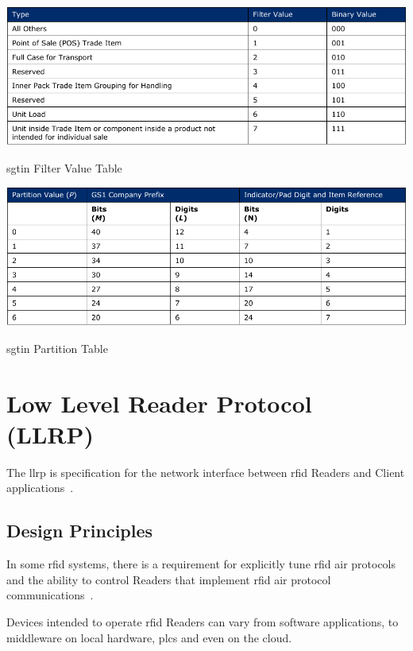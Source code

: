 \begin{table}[]
    \centering
    \includegraphics[width=\textwidth]{./figs/02-state-of-the-art/table_sgtin_filtervalues.pdf}
    \caption{\ac{sgtin} Filter Value Table~\cite{EPCTagData}} 
    \label{tab:sgtinfiltervalues}
\end{table}

\begin{table}[]
    \centering
    \includegraphics[width=\textwidth]{./figs/02-state-of-the-art/table_partitionvalues.pdf}
    \caption{\ac{sgtin} Partition Table~\cite{EPCTagData}} 
    \label{tab:partitiontable}
\end{table}

\section{Low Level Reader Protocol (LLRP)}

The \acf{llrp} is specification for the network interface between \ac{rfid} Readers and Client applications~\cite{ImpinjLTKProgrammers}.

\subsection{Design Principles}

In some \ac{rfid} systems, there is a requirement for explicitly tune \ac{rfid} air protocols and the ability to control Readers that implement \ac{rfid} air protocol communications~\cite{LowLevelReader}.

Devices intended to operate \ac{rfid} Readers can vary from software applications, to middleware on local hardware, \acp{plc} and even on the cloud.

